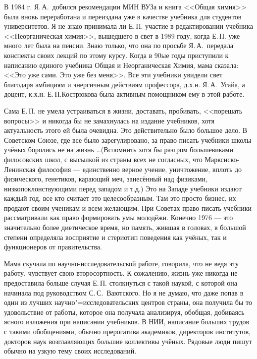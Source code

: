 В 1984 г. Я.\,А.~добился рекомендации МИН ВУЗа и книга <<Общая химия>> была вновь переработана и переиздана уже в качестве учебника для студентов университетов. Я не знаю принимала ли Е.\,П. участие в редактировании учебника <<Неорганическая химия>>, вышедшего в свет в 1989 году, когда Е.\,П. уже много лет была на пенсии. Знаю только, что она по просьбе Я.\,А.~передала конспекты своих лекций по этому курсу. Когда в 90ые годы приступили к написанию единого учебника Общая и Неорганическая Химия, мама сказала: <<Это уже сами. Это уже без меня>>. Все эти учебники увидели свет благодаря амбициям и энергичным действиям профессора, д.х.н. Я.\,А.~Угайа, а доцент, к.х.н. Е.\,П.Кострюкова была активным помощником ему в этой работе.

Сама Е.\,П. не умела устраиваться в жизни, доставать, пробивать, <<порешать вопросы>> и никогда бы не замахнулась на  издание  учебников, хотя актуальность этого ей была очевидна. Это действительно было большое дело. В Советском Союзе, где все было зарегулировано, за право писать учебники школы учёных боролись не на жизнь \ldots (Вспом\-нить хотя бы разгром большевиками филосовских школ, с высылкой из страны всех не согласных, что Марксиско-Ленинская философия --- единственно верное учение, уничтожение, вплоть до физического, генетиков, карающий \linebreak меч, занесённый над физиками, низкопоклонствующими перед западом  и т.д.) Это на Западе учебники издают каждый год, все кто считает это целесообразным. Там это просто бизнес, их продают своим ученикам и всем желающим. При Советах право писать учебники рассматривали как право формировать умы молодёжи. Конечно 1976 --- это значительно более диетическое время, но память, жившая в головах, в большой степени определяла восприятие и стериотип поведения как учёных, так и функционеров от правительства.

Мама скучала по научно-исследовательской работе, говорила, что не ведя эту работу, чувствует свою второсортность.
К сожалению, жизнь уже никогда не предоставила больше случая Е.\,П. столкнуться с такой наукой,
с которой она начинала под руководством С.\,С.~Ваютского.
Но я не думаю, что даже попав в один из лучших на\-уч\-но"=ис\-сле\-до\-ва\-тель\-с\-ких центров страны, она получила бы то удовольствие от работы, которое она получала анализируя, обобщая, добиваясь ясного изложения при написании учебников. В НИИ, написание больших трудов с такими обобщениями, обычно прерогатива академиков, директоров институтов, докторов наук возглавляющих большие коллективы учёных. Рядовые люди пишут обычно на узкую тему своих исследований.

